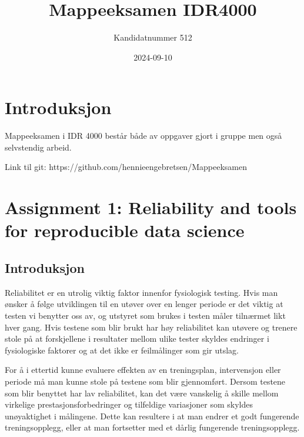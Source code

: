 \documentclass[
  letterpaper,
  DIV=11,
  numbers=noendperiod]{scrreprt}
\title{Mappeeksamen IDR4000}
\author{Kandidatnummer 512}
\date{2024-09-10}
\renewcommand*\contentsname{Table of contents}
\newcommand\contentsname{Table of contents}
\begin{document}
\maketitle

\renewcommand*\contentsname{Table of contents}
{
\hypersetup{linkcolor=}
\setcounter{tocdepth}{2}
\tableofcontents
}


\chapter*{Introduksjon}\label{introduksjon}


Mappeeksamen i IDR 4000 består både av oppgaver gjort i gruppe men også
selvstendig arbeid.

Link til git: https://github.com/hennieengebretsen/Mappeeksamen


\chapter{Assignment 1: Reliability and tools for reproducible data
science}\label{assignment1}

\section{Introduksjon}\label{introduksjon-1}

Reliabilitet er en utrolig viktig faktor innenfor fysiologisk testing.
Hvis man ønsker å følge utviklingen til en utøver over en lenger periode
er det viktig at testen vi benytter oss av, og utstyret som brukes i
testen måler tilnærmet likt hver gang. Hvis testene som blir brukt har
høy reliabilitet kan utøvere og trenere stole på at forskjellene i
resultater mellom ulike tester skyldes endringer i fysiologiske faktorer
og at det ikke er feilmålinger som gir utslag.

For å i ettertid kunne evaluere effekten av en treningsplan,
intervensjon eller periode må man kunne stole på testene som blir
gjennomført. Dersom testene som blir benyttet har lav reliabilitet, kan
det være vanskelig å skille mellom virkelige prestasjonsforbedringer og
tilfeldige variasjoner som skyldes unøyaktighet i målingene. Dette kan
resultere i at man endrer et godt fungerende treningsopplegg, eller at
man fortsetter med et dårlig fungerende treningsopplegg.
\end{document}
